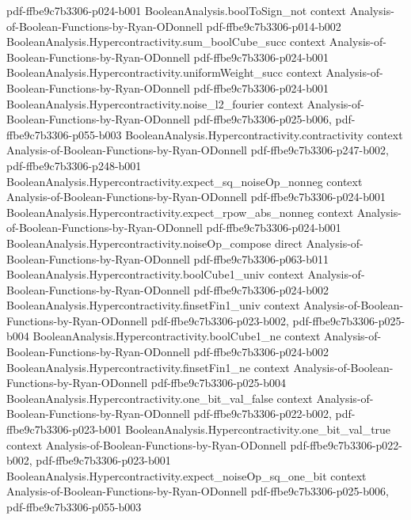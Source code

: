 \begin{theorem}
  {pdf-ffbe9c7b3306-p024-b001}
\proofstep
  {BooleanAnalysis.boolToSign_not}
  {context}
  {Analysis-of-Boolean-Functions-by-Ryan-ODonnell}
  {pdf-ffbe9c7b3306-p014-b002}
\proofstep
  {BooleanAnalysis.Hypercontractivity.sum_boolCube_succ}
  {context}
  {Analysis-of-Boolean-Functions-by-Ryan-ODonnell}
  {pdf-ffbe9c7b3306-p024-b001}
\proofstep
  {BooleanAnalysis.Hypercontractivity.uniformWeight_succ}
  {context}
  {Analysis-of-Boolean-Functions-by-Ryan-ODonnell}
  {pdf-ffbe9c7b3306-p024-b001}
\proofstep
  {BooleanAnalysis.Hypercontractivity.noise_l2_fourier}
  {context}
  {Analysis-of-Boolean-Functions-by-Ryan-ODonnell}
  {pdf-ffbe9c7b3306-p025-b006,
    pdf-ffbe9c7b3306-p055-b003}
\proofstep
  {BooleanAnalysis.Hypercontractivity.contractivity}
  {context}
  {Analysis-of-Boolean-Functions-by-Ryan-ODonnell}
  {pdf-ffbe9c7b3306-p247-b002,
    pdf-ffbe9c7b3306-p248-b001}
\proofstep
  {BooleanAnalysis.Hypercontractivity.expect_sq_noiseOp_nonneg}
  {context}
  {Analysis-of-Boolean-Functions-by-Ryan-ODonnell}
  {pdf-ffbe9c7b3306-p024-b001}
\proofstep
  {BooleanAnalysis.Hypercontractivity.expect_rpow_abs_nonneg}
  {context}
  {Analysis-of-Boolean-Functions-by-Ryan-ODonnell}
  {pdf-ffbe9c7b3306-p024-b001}
\proofstep
  {BooleanAnalysis.Hypercontractivity.noiseOp_compose}
  {direct}
  {Analysis-of-Boolean-Functions-by-Ryan-ODonnell}
  {pdf-ffbe9c7b3306-p063-b011}
\proofstep
  {BooleanAnalysis.Hypercontractivity.boolCube1_univ}
  {context}
  {Analysis-of-Boolean-Functions-by-Ryan-ODonnell}
  {pdf-ffbe9c7b3306-p024-b002}
\proofstep
  {BooleanAnalysis.Hypercontractivity.finsetFin1_univ}
  {context}
  {Analysis-of-Boolean-Functions-by-Ryan-ODonnell}
  {pdf-ffbe9c7b3306-p023-b002,
    pdf-ffbe9c7b3306-p025-b004}
\proofstep
  {BooleanAnalysis.Hypercontractivity.boolCube1_ne}
  {context}
  {Analysis-of-Boolean-Functions-by-Ryan-ODonnell}
  {pdf-ffbe9c7b3306-p024-b002}
\proofstep
  {BooleanAnalysis.Hypercontractivity.finsetFin1_ne}
  {context}
  {Analysis-of-Boolean-Functions-by-Ryan-ODonnell}
  {pdf-ffbe9c7b3306-p025-b004}
\proofstep
  {BooleanAnalysis.Hypercontractivity.one_bit_val_false}
  {context}
  {Analysis-of-Boolean-Functions-by-Ryan-ODonnell}
  {pdf-ffbe9c7b3306-p022-b002,
    pdf-ffbe9c7b3306-p023-b001}
\proofstep
  {BooleanAnalysis.Hypercontractivity.one_bit_val_true}
  {context}
  {Analysis-of-Boolean-Functions-by-Ryan-ODonnell}
  {pdf-ffbe9c7b3306-p022-b002,
    pdf-ffbe9c7b3306-p023-b001}
\proofstep
  {BooleanAnalysis.Hypercontractivity.expect_noiseOp_sq_one_bit}
  {context}
  {Analysis-of-Boolean-Functions-by-Ryan-ODonnell}
  {pdf-ffbe9c7b3306-p025-b006,
    pdf-ffbe9c7b3306-p055-b003}

\end{theorem}
